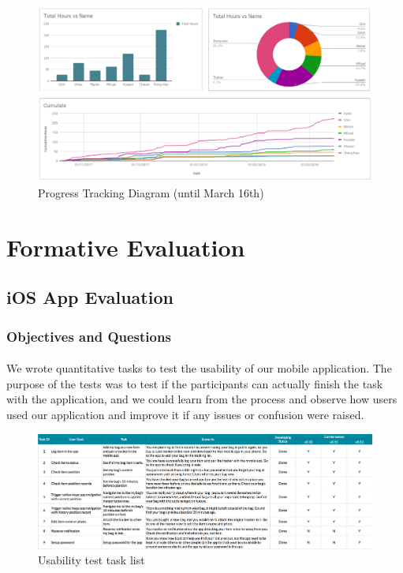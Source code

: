 \documentclass[12pt,a4paper]{article}
\begin{document}
          \begin{figure}[H]
            \centering
            \includegraphics[width=1\textwidth]{../assets/development-records-progress-tracking-diagram.png}
            \caption{Progress Tracking Diagram (until March 16th)}
            \label{fig:Progress Tracking Diagram}
          \end{figure}

    \section{Formative Evaluation}
      \label{Chapter:Formative Evaluation}
      \subsection{iOS App Evaluation} 
        
        \subsubsection{Objectives and Questions}
          \paragraph{}
            We wrote quantitative tasks to test the usability of our mobile application\cite{WritingTasks}. The purpose of the tests was to test if the participants can actually finish the task with the application, and we could learn from the process and observe how users used our application and improve it if any issues or confusion were raised. 

            \begin{figure}[H]
              \centering
              \includegraphics[width=1\textwidth]{../assets/usability-test-task-list.png}
              \caption{Usability test task list}
              \label{fig:Usability test task list}
            \end{figure}
\end{document}
